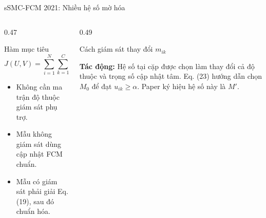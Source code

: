 \documentclass[t,aspectratio=169]{beamer}
\begin{document}
\begin{frame}{sSMC-FCM 2021: Nhiều hệ số mờ hóa}
  \small
  \begin{columns}[T,onlytextwidth]
    \begin{column}{0.47\textwidth}
      \begin{block}{Hàm mục tiêu}
        \[
          J(U,V)=\sum_{i=1}^{N}\sum_{k=1}^{C}
          u_{ik}^{m_{ik}}D_{ik}^{2}
        \]
      \end{block}

      \begin{itemize}
        \item Không cần ma trận độ thuộc giám sát phụ trợ.
        \item Mẫu không giám sát dùng cập nhật FCM chuẩn.
        \item Mẫu có giám sát phải giải Eq. (19), sau đó chuẩn hóa.
      \end{itemize}
    \end{column}
    \begin{column}{0.49\textwidth}
      \begin{block}{Cách giám sát thay đổi $m_{ik}$}
        \centering
      \end{block}

      \vspace{0.25em}
      \textbf{Tác động:} Hệ số tại cặp được chọn làm thay đổi cả độ thuộc và trọng số cập nhật tâm. Eq. (23) hướng dẫn chọn $M_0$ để đạt $u_{ik}\geq\alpha$. Paper ký hiệu hệ số này là $M'$.
    \end{column}
  \end{columns}
\end{frame}
\end{document}

